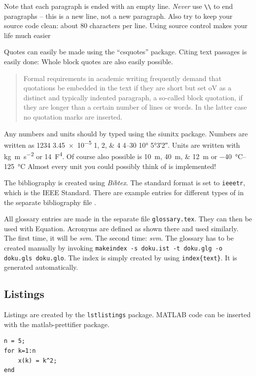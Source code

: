 %
Note that each paragraph is ended with an empty line. 
\emph{Never} use \verb|\\| to end paragraphs -- this is a new line, not a new paragraph.
Also try to keep your source code clean: about 80 characters per line.
Using source control makes your life much easier

%
Quotes can easily be made using the \enquote{csquotes} package.
Citing text passages is easily done:  Whole block quotes are also easily 
possible.

\blockquote{Formal requirements in academic writing frequently demand that
quotations be embedded in the text if they are short but set oV as a distinct
and typically indented paragraph, a so-called block quotation, if they are
longer than a certain number of lines or words. In the latter case no quotation
marks are inserted.}

%
Any numbers and units should by typed using the siunitx package.
Numbers are written as \num{1234} \num{3.45e-5} \numlist{1;2;4} \numrange{4}{30} \ang{10} \ang{5;3;2}.
Units are written with \si{\kilo\gram\meter\per\square\second} or \SI{14}{\farad\tothe{4}}.
Of course also possible is \SIlist{10;40;12}{\meter} or \SIrange{-40}{+125}{\degreeCelsius}
Almost every unit you could possibly think of is implemented!

%
The bibliography is created using \emph{Bibtex}. The
standard format is set to \texttt{ieeetr}, which is the IEEE Standard. There
are example entries for different types of  in the separate bibliography file
\cite{article} \cite{book} \cite{booklet} \cite{conference} \cite{inbook}
\cite{incollection} \cite{manual} \cite{mastersthesis} \cite{misc}
\cite{phdthesis} \cite{proceedings} \cite{techreport} \cite{unpublished}.

%
All glossary entries are made in the separate file \texttt{glossary.tex}.
They can then be used with \gls{Equation}.
Acronyms are defined as shown there and used similarly. 
The first time, it will be \emph{\gls{svm}}.
The second time: \emph{\gls{svm}}.
The glossary has to be created manually by invoking \texttt{makeindex -s doku.ist -t doku.glg -o doku.gls doku.glo}.
The index is simply created by using \texttt{index\{text\}}. It is generated automatically.

\subsection{Listings}
Listings are created by the \texttt{lstlistings} package.
MATLAB code can be inserted with the matlab-prettifier package.

\begin{lstlisting}[style=Matlab-editor]
% Some test program
n = 5;
for k=1:n
    x(k) = k^2;
end
\end{lstlisting}